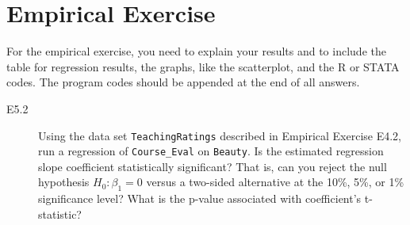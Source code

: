 \documentclass[a4paper,11pt]{article}
\begin{document}
\section*{Empirical Exercise}
\label{sec:org54ace57}

For the empirical exercise, you need to explain your results and to
include the table for regression results, the graphs, like the
scatterplot, and the R or STATA codes. The program codes should be
appended at the end of all answers.

\begin{description}
\item[{E5.2}] Using the data set \texttt{TeachingRatings} described in Empirical
Exercise E4.2, run a regression of \texttt{Course\_Eval} on
\texttt{Beauty}. Is the estimated regression slope coefficient
statistically significant? That is, can you reject the null
hypothesis \(H_0: \beta_1 = 0\) versus a two-sided alternative
at the 10\%, 5\%, or 1\% significance level? What is the
p-value associated with coefficient's t-statistic?
\end{description}
\end{document}
